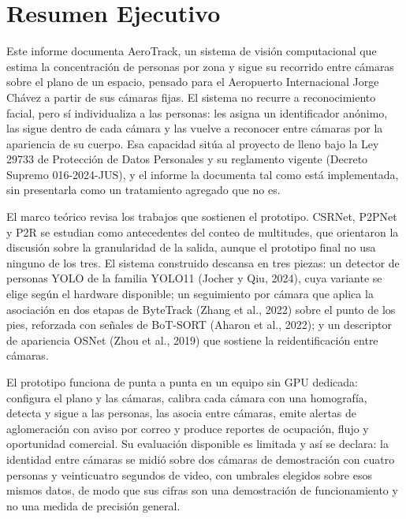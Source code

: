 \section{Resumen Ejecutivo}
\label{sec:resumen-ejecutivo}

Este informe documenta AeroTrack, un sistema de visión computacional que estima la
concentración de personas por zona y sigue su recorrido entre cámaras sobre el plano de un
espacio, pensado para el Aeropuerto Internacional Jorge Chávez a partir de sus cámaras fijas.
El sistema no recurre a reconocimiento facial, pero sí individualiza a las personas: les asigna un
identificador anónimo, las sigue dentro de cada cámara y las vuelve a reconocer entre cámaras
por la apariencia de su cuerpo. Esa capacidad sitúa al proyecto de lleno bajo la Ley 29733 de
Protección de Datos Personales y su reglamento vigente (Decreto Supremo 016-2024-JUS), y el
informe la documenta tal como está implementada, sin presentarla como un tratamiento
agregado que no es.

El marco teórico revisa los trabajos que sostienen el prototipo. CSRNet, P2PNet y P2R se
estudian como antecedentes del conteo de multitudes, que orientaron la discusión sobre la
granularidad de la salida, aunque el prototipo final no usa ninguno de los tres. El sistema
construido descansa en tres piezas: un detector de personas YOLO de la familia YOLO11
(Jocher y Qiu, 2024), cuya variante se elige según el hardware disponible; un seguimiento por
cámara que aplica la asociación en dos etapas de ByteTrack (Zhang et al., 2022) sobre el punto
de los pies, reforzada con señales de BoT-SORT (Aharon et al., 2022); y un descriptor de
apariencia OSNet (Zhou et al., 2019) que sostiene la reidentificación entre cámaras.

El prototipo funciona de punta a punta en un equipo sin GPU dedicada: configura el plano y
las cámaras, calibra cada cámara con una homografía, detecta y sigue a las personas, las asocia
entre cámaras, emite alertas de aglomeración con aviso por correo y produce reportes de
ocupación, flujo y oportunidad comercial. Su evaluación disponible es limitada y así se declara:
la identidad entre cámaras se midió sobre dos cámaras de demostración con cuatro personas y
veinticuatro segundos de video, con umbrales elegidos sobre esos mismos datos, de modo que
sus cifras son una demostración de funcionamiento y no una medida de precisión general.

